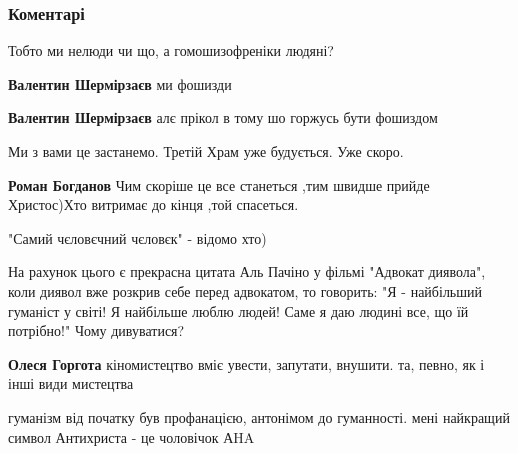  
 
 
 
 
\subsubsection{Коментарі}

\begin{itemize} %
Тобто ми нелюди чи що, а гомошизофреніки людяні?

\begin{itemize} %
\textbf{Валентин Шермірзаєв} ми фошизди

\textbf{Валентин Шермірзаєв} алє прікол в тому шо горжусь бути фошиздом
\end{itemize} %

Ми з вами це застанемо.
Третій Храм уже будується.
Уже скоро.

\begin{itemize} %
\textbf{Роман Богданов} Чим скоріше це все станеться ,тим швидше прийде Христос)Хто витримає до кінця ,той спасеться.
\end{itemize} %

"Самий чєловєчний чєловєк" - відомо хто)

На рахунок цього є прекрасна цитата Аль Пачіно у фільмі "Адвокат диявола", коли диявол вже розкрив себе перед адвокатом, то говорить: "Я - найбільший гуманіст у світі! Я найбільше люблю людей! Саме я даю людині все, що їй потрібно!"
Чому дивуватися?

\begin{itemize} %
\textbf{Олеся Горгота} кіномистецтво вміє увести, запутати, внушити. та, певно, як і інші види мистецтва
\end{itemize} %


гуманізм від початку був профанацією, антонімом до гуманності. мені найкращий
символ Антихриста - це чоловічок АHA

\begin{itemize} %


\end{itemize}
\end{itemize}
